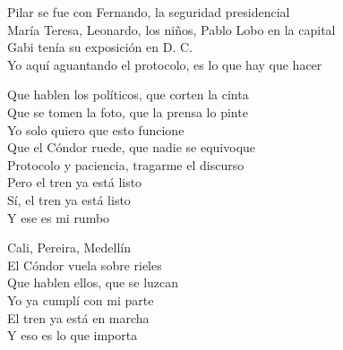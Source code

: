 \begin{lyrics}
Pilar se fue con Fernando, la seguridad presidencial\\
María Teresa, Leonardo, los niños, Pablo Lobo en la capital\\
Gabi tenía su exposición en D. C.\\
Yo aquí aguantando el protocolo, es lo que hay que hacer

Que hablen los políticos, que corten la cinta\\
Que se tomen la foto, que la prensa lo pinte\\
Yo solo quiero que esto funcione\\
Que el Cóndor ruede, que nadie se equivoque\\
Protocolo y paciencia, tragarme el discurso\\
Pero el tren ya está listo\\
Sí, el tren ya está listo\\
Y ese es mi rumbo

Cali, Pereira, Medellín\\
El Cóndor vuela sobre rieles\\
Que hablen ellos, que se luzcan\\
Yo ya cumplí con mi parte\\
El tren ya está en marcha\\
Y eso es lo que importa
\end{lyrics}

